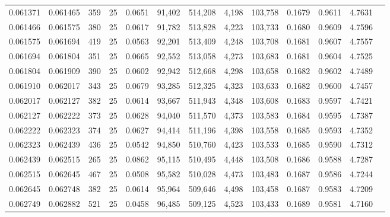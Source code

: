 \begin{tabular}{rrrrrrrrrrrrr}
0.061371 & 0.061465 &   359 &  25 &                                     0.0651 &  91,402 & 514,208 &   4,198 & 103,758 & 0.1679 & 0.9611 & 4.7631 \\
0.061466 & 0.061575 &   380 &  25 &                                     0.0617 &  91,782 & 513,828 &   4,223 & 103,733 & 0.1680 & 0.9609 & 4.7596 \\
0.061575 & 0.061694 &   419 &  25 &                                     0.0563 &  92,201 & 513,409 &   4,248 & 103,708 & 0.1681 & 0.9607 & 4.7557 \\
0.061694 & 0.061804 &   351 &  25 &                                     0.0665 &  92,552 & 513,058 &   4,273 & 103,683 & 0.1681 & 0.9604 & 4.7525 \\
0.061804 & 0.061909 &   390 &  25 &                                     0.0602 &  92,942 & 512,668 &   4,298 & 103,658 & 0.1682 & 0.9602 & 4.7489 \\
0.061910 & 0.062017 &   343 &  25 &                                     0.0679 &  93,285 & 512,325 &   4,323 & 103,633 & 0.1682 & 0.9600 & 4.7457 \\
0.062017 & 0.062127 &   382 &  25 &                                     0.0614 &  93,667 & 511,943 &   4,348 & 103,608 & 0.1683 & 0.9597 & 4.7421 \\
0.062127 & 0.062222 &   373 &  25 &                                     0.0628 &  94,040 & 511,570 &   4,373 & 103,583 & 0.1684 & 0.9595 & 4.7387 \\
0.062222 & 0.062323 &   374 &  25 &                                     0.0627 &  94,414 & 511,196 &   4,398 & 103,558 & 0.1685 & 0.9593 & 4.7352 \\
0.062323 & 0.062439 &   436 &  25 &                                     0.0542 &  94,850 & 510,760 &   4,423 & 103,533 & 0.1685 & 0.9590 & 4.7312 \\
0.062439 & 0.062515 &   265 &  25 &                                     0.0862 &  95,115 & 510,495 &   4,448 & 103,508 & 0.1686 & 0.9588 & 4.7287 \\
0.062515 & 0.062645 &   467 &  25 &                                     0.0508 &  95,582 & 510,028 &   4,473 & 103,483 & 0.1687 & 0.9586 & 4.7244 \\
0.062645 & 0.062748 &   382 &  25 &                                     0.0614 &  95,964 & 509,646 &   4,498 & 103,458 & 0.1687 & 0.9583 & 4.7209 \\
0.062749 & 0.062882 &   521 &  25 &                                     0.0458 &  96,485 & 509,125 &   4,523 & 103,433 & 0.1689 & 0.9581 & 4.7160 \\

\end{tabular}
